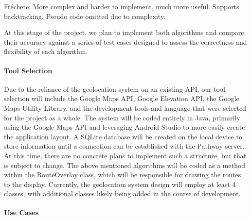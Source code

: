 \documentclass{article}
\begin{document}
Fréchete: More complex and harder to implement, much more useful. Supports backtracking. Pseudo code omitted due to complexity.

At this stage of the project, we plan to implement both algorithms and compare their accuracy against a series of test cases designed to assess the correctness and flexibility of each algorithm.

\paragraph{Tool Selection}
Due to the reliance of the geolocation system on an existing API, our tool selection will include the Google Maps API, Google Elevation API, the Google Maps Utility Library, and the development tools and language that were selected for the project as a whole. The system will be coded entirely in Java, primarily using the Google Maps API and leveraging Android Studio to more easily create the application layout. A SQLite database will be created on the local device to store information until a connection can be established with the Pathway server. At this time, there are no concrete plans to implement such a structure, but that is subject to change. The above mentioned algorithms will be coded as a method within the RouteOverlay class, which will be responsible for drawing the routes to the display. Currently, the geolocation system design will employ at least 4 classes, with additional classes likely being added in the course of development.

\paragraph{Use Cases}
\end{document}
